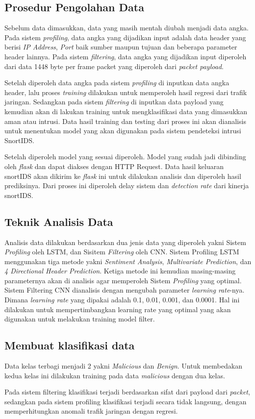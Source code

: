 \documentclass[./skripsi.tex]{subfiles}
\begin{document}
\subsection{Prosedur Pengolahan Data}
\par Sebelum data dimasukkan, data yang masih mentah diubah menjadi data angka. Pada sistem \textit{profiling}, data angka yang dijadikan input adalah data header yang berisi \textit{IP Address}, \textit{Port} baik sumber maupun tujuan dan beberapa parameter header lainnya. Pada sistem \textit{filtering}, data angka yang dijadikan input diperoleh dari data 1448 byte per frame packet yang diperoleh dari \textit{packet payload}.
\par Setelah diperoleh data angka pada sistem \textit{profiling} di inputkan data angka header, lalu proses \textit{training} dilakukan untuk memperoleh hasil regresi dari trafik jaringan. Sedangkan pada sistem \textit{filtering} di inputkan data payload yang kemudian akan di lakukan training untuk mengklasifikasi data yang dimasukkan aman atau intrusi. Data hasil training dan testing dari proses ini akan dianalisis untuk menentukan model yang akan digunakan pada sistem pendeteksi intrusi SnortIDS.
\par Setelah diperoleh model yang sesuai diperoleh. Model yang sudah jadi dibinding oleh \textit{flask} dan dapat diakses dengan HTTP Request. Data hasil keluaran snortIDS akan dikirim ke \textit{flask} ini untuk dilakukan analisis dan diperoleh hasil prediksinya. Dari proses ini diperoleh delay sistem dan \textit{detection rate} dari kinerja snortIDS.
\subsection{Teknik Analisis Data}
\par Analisis data dilakukan berdasarkan dua jenis data yang diperoleh yakni Sistem \textit{Profiling} oleh LSTM, dan Sisitem \textit{Filtering} oleh CNN. Sistem Profiling LSTM menggunakan tiga metode yakni \textit{Sentiment Analysis}, \textit{Multivariate Prediction}, dan \textit{4 Directional Header Prediction}. Ketiga metode ini kemudian masing-masing parameternya akan di analisis agar memperoleh Sistem \textit{Profiling} yang optimal. Sistem Filtering CNN dianalisis dengan mengubah parameter \textit{learning rate}-nya. Dimana \textit{learning rate} yang dipakai adalah 0.1, 0.01, 0.001, dan 0.0001. Hal ini dilakukan untuk mempertimbangkan learning rate yang optimal yang akan digunakan untuk melakukan training model filter.

\subsection{Membuat klasifikasi data}
\par Data kelas terbagi menjadi 2 yakni \textit{Malicious} dan \textit{Benign}. Untuk membedakan kedua kelas ini dilakukan training pada data \textit{malicious} dengan dua kelas.
\par Pada sistem filtering klasifikasi terjadi berdasarkan sifat dari payload dari \textit{packet}, sedangkan pada sistem profiling klasifikasi terjadi secara tidak langsung, dengan memperhitungkan anomali trafik jaringan dengan regresi.
\end{document}

